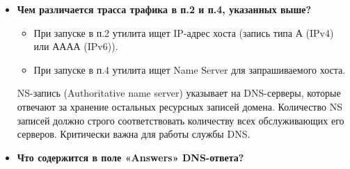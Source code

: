 \documentclass[12pt,onecolumn]{article}
\begin{document}
\begin{itemize}
    \item {
        \textbf{Чем различается трасса трафика в п.2 и п.4, указанных выше?}
        \begin{itemize}
            \item При запуске в п.2 утилита ищет IP-адрес хоста (запись типа А (IPv4) или АААА
            (IPv6)).
            \item При запуске в п.4 утилита ищет Name Server для запрашиваемого хоста.
        \end{itemize}

        NS-запись (Authoritative name server) указывает на DNS-серверы, которые отвечают за хранение остальных ресурсных записей домена. Количество NS записей должно строго соответствовать количеству всех обслуживающих его серверов. Критически важна для работы службы DNS.
    }
    \item {
        \textbf{Что содержится в поле «Answers» DNS-ответа?}
        
}
\end{itemize}
\end{document}
